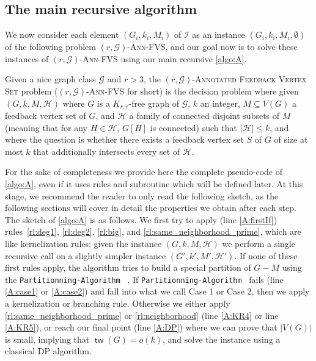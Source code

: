 \documentclass{amsart}
\newcommand{\algopart }{\texttt{Partitionning-Algorithm}~ }
\newcommand{\G}{\mathcal{G}}
\newcommand{\I}{\mathcal{I}}
\newcommand{\mH}{\mathcal{H}}
\DeclareMathOperator\tw{\textsf{tw}}
\newcommand{\afvs}{\textsc{$(r,\G)$-Annotated Feedback Vertex Set}\xspace}
\newcommand{\AFVS}{\textsc{$(r,\G)$-Ann-FVS}\xspace}
\newcommand{\ruleref}[1]{\hyperref[#1]{\ref*{#1}}}
\begin{document}
\subsection{The main recursive algorithm}\label{ssec:step3}
We now consider each element $(G_i,k_i,M_i)$ of  $\I$ as an instance $(G_i,k_i,M_i,\emptyset)$ of the following problem \AFVS, and our goal now is to solve these instances of \AFVS using our main recursive \autoref{algo:A}.
\begin{definition}\label{def:afvs}
    Given a nice graph class $\G$ and $r>3$, the \afvs problem (\AFVS{} for short) is the decision problem 
    where given $(G, k, M, \mH)$ where $G$ is a $K_{r,r}$-free graph of $\G$, $k$ an integer, $M\subseteq V(G)$ a feedback vertex set of $G$, and $\mH$ a family of connected disjoint subsets of $M$ (meaning that for any $H \in \mH$, $G[H]$ is connected) such that $|\mH| \le k$,
    and where the question is whether there exists a feedback vertex set $S$ of $G$ of size at most $k$ that additionally intersects every set of $\mH$.
\end{definition}

For the sake of completeness we provide here the complete pseudo-code of \autoref{algo:A}, even if it uses rules and subroutine which will be defined later. At this stage, we recommend the reader to only read the following sketch, as the following sections will cover in detail the properties we obtain after each step.
The sketch of \autoref{algo:A} is as follows. We first try to apply (line \ref{A:firstIf}) rules~\ruleref{rl:deg1}, \ruleref{rl:deg2}, \ruleref{rl:big}, and \ruleref{rl:same_neighborhood_prime},  which are like kernelization rules: given the instance $(G,k,M,\mH)$ we perform a single recursive call on a slightly simpler instance $(G',k',M',\mH')$. 
 If none of these first rules apply, the algorithm tries to build a special partition of $G-M$ using the \algopart{}.
 If \algopart fails (line \ref{A:case1} or \ref{A:case2}) and fall into what we call Case 1 or Case 2, then we apply a kernelization or branching rule.
 Otherwise we either apply \ruleref{rl:same_neighborhood_prime} or \ruleref{rl:neighborhood} (line \ref{A:KR4} or line \ref{A:KR5}), or reach our final point (line \ref{A:DP}) where we can prove that $|V(G)|$ is small, implying that $\tw(G)=o(k)$, and solve the instance using a classical DP algorithm.
 
\end{document}
